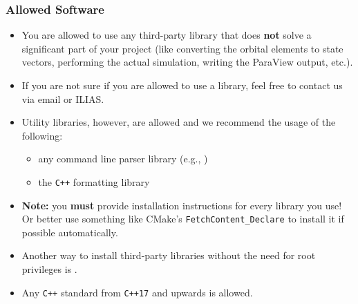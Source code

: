 \begin{frame}[fragile]
  \frametitle{Allowed Software}
  \begin{itemize}
      \item You are allowed to use any third-party library that does \textbf{not} solve a significant part of your project (like converting the orbital elements to state vectors, performing the actual simulation, writing the ParaView output, etc.).
      \item If you are not sure if you are allowed to use a library, feel free to contact us via email or ILIAS.
      \item Utility libraries, however, are allowed and we recommend the usage of the following:
      \begin{itemize}
          \item any command line parser library (e.g., )
          \item the \texttt{C++} formatting library 
      \end{itemize}
      \item \textbf{Note:} you \textbf{must} provide installation instructions for every library you use! Or better use something like CMake's \texttt{FetchContent_Declare} to install it if possible automatically.
      \item Another way to install third-party libraries without the need for root privileges is .
      \item Any \texttt{C++} standard from \texttt{C++17} and upwards is allowed.
  \end{itemize}
\end{frame}

